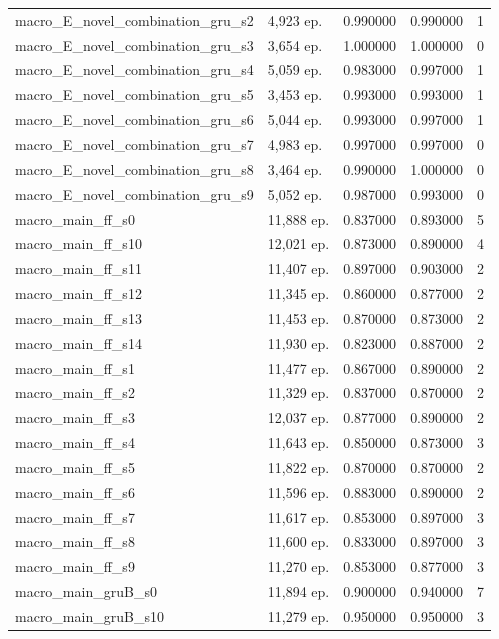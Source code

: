 \begin{tabular}{llrrr}
macro\_E\_novel\_combination\_gru\_s2 & 4,923 ep. & 0.990000 & 0.990000 & 1 \\
macro\_E\_novel\_combination\_gru\_s3 & 3,654 ep. & 1.000000 & 1.000000 & 0 \\
macro\_E\_novel\_combination\_gru\_s4 & 5,059 ep. & 0.983000 & 0.997000 & 1 \\
macro\_E\_novel\_combination\_gru\_s5 & 3,453 ep. & 0.993000 & 0.993000 & 1 \\
macro\_E\_novel\_combination\_gru\_s6 & 5,044 ep. & 0.993000 & 0.997000 & 1 \\
macro\_E\_novel\_combination\_gru\_s7 & 4,983 ep. & 0.997000 & 0.997000 & 0 \\
macro\_E\_novel\_combination\_gru\_s8 & 3,464 ep. & 0.990000 & 1.000000 & 0 \\
macro\_E\_novel\_combination\_gru\_s9 & 5,052 ep. & 0.987000 & 0.993000 & 0 \\
macro\_main\_ff\_s0 & 11,888 ep. & 0.837000 & 0.893000 & 5 \\
macro\_main\_ff\_s10 & 12,021 ep. & 0.873000 & 0.890000 & 4 \\
macro\_main\_ff\_s11 & 11,407 ep. & 0.897000 & 0.903000 & 2 \\
macro\_main\_ff\_s12 & 11,345 ep. & 0.860000 & 0.877000 & 2 \\
macro\_main\_ff\_s13 & 11,453 ep. & 0.870000 & 0.873000 & 2 \\
macro\_main\_ff\_s14 & 11,930 ep. & 0.823000 & 0.887000 & 2 \\
macro\_main\_ff\_s1 & 11,477 ep. & 0.867000 & 0.890000 & 2 \\
macro\_main\_ff\_s2 & 11,329 ep. & 0.837000 & 0.870000 & 2 \\
macro\_main\_ff\_s3 & 12,037 ep. & 0.877000 & 0.890000 & 2 \\
macro\_main\_ff\_s4 & 11,643 ep. & 0.850000 & 0.873000 & 3 \\
macro\_main\_ff\_s5 & 11,822 ep. & 0.870000 & 0.870000 & 2 \\
macro\_main\_ff\_s6 & 11,596 ep. & 0.883000 & 0.890000 & 2 \\
macro\_main\_ff\_s7 & 11,617 ep. & 0.853000 & 0.897000 & 3 \\
macro\_main\_ff\_s8 & 11,600 ep. & 0.833000 & 0.897000 & 3 \\
macro\_main\_ff\_s9 & 11,270 ep. & 0.853000 & 0.877000 & 3 \\
macro\_main\_gruB\_s0 & 11,894 ep. & 0.900000 & 0.940000 & 7 \\
macro\_main\_gruB\_s10 & 11,279 ep. & 0.950000 & 0.950000 & 3 \\

\end{tabular}
